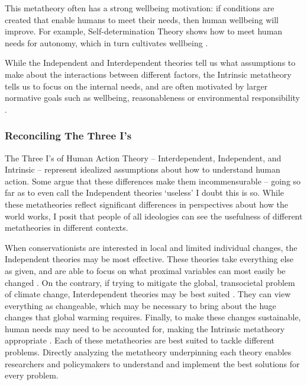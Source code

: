 \documentclass[12 pt]{article}
\begin{document}
	 This metatheory often has a strong wellbeing motivation: if conditions are created that enable humans to meet their needs, then human wellbeing will improve. For example, Self-determination Theory shows how to meet human needs for autonomy, which in turn cultivates wellbeing \parencite{Ryan2000a}.
	 
	 While the Independent and Interdependent theories tell us what assumptions to make about the interactions between different factors, the Intrinsic metatheory tells us to focus on the internal needs, and are often motivated by larger normative goals such as wellbeing, reasonableness or environmental responsibility \parencite{Hungerford1990, Ryan2000a,Kaplan2009}.
	 
	 	\subsubsection{Reconciling The Three I's}  The Three I's of Human Action Theory -- Interdependent, Independent, and Intrinsic -- represent idealized assumptions about how to understand human action. Some argue that these differences make them incommensurable -- going so far as to even call the Independent theories `useless' \parencite[][p. 1202]{Shove2010} I doubt this is so. While these metatheories reflect significant differences in perspectives about how the world works, I posit that people of all ideologies can see the usefulness of different metatheories in different contexts. 
	 	
	 	 When conservationists are interested in local and limited individual changes, the Independent theories may be most effective. These theories take everything else as given, and are able to focus on what proximal variables can most easily be changed \parencite{Hastings2003}. On the contrary, if trying to mitigate the global, transocietal problem of climate change, Interdependent theories may be best suited \parencite{Shove2010}. They can view everything as changeable, which may be necessary to bring about the huge changes that global warming requires. Finally, to make these changes sustainable, human needs may need to be accounted for, making the Intrinsic metatheory appropriate \parencite{Herzberg1968,Ryan2000a}. Each of these metatheories are best suited to tackle different problems. Directly analyzing the metatheory underpinning each theory enables researchers and policymakers to understand and implement the best solutions for every problem. 
	 
\end{document}
